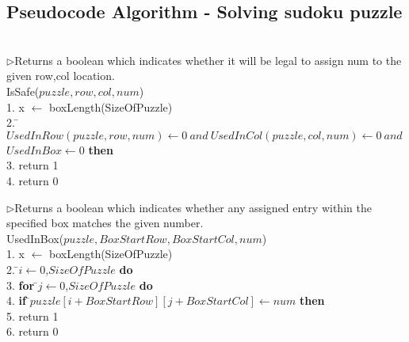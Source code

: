 \documentclass[12pt, letterpaper]{article}
\begin{document}
        \subsection{Pseudocode Algorithm - Solving sudoku puzzle}

            \begin{center}
            \begin{tabbing}
            \\
            $\rhd$Returns a boolean which indicates whether it will be legal to assign
               num to the\\ given row,col location. \\
            IsSafe($puzzle, row, col, num $) \\
            1. \indent x $\leftarrow$ boxLength(SizeOfPuzzle) \\
            2.  \=$UsedInRow(puzzle, row, num ) \leftarrow 0 \: and \: UsedInCol(puzzle,col,num) \leftarrow 0 \: and $ \\  \> $UsedInBox \leftarrow 0$ {\bf then} \\
            3. \indent            \> return 1 \\
            4. \indent return 0 \\ 
            \end{tabbing}
            \label{fig_alg_ex}
            \end{center}


            \begin{center}
            \begin{tabbing}
            $\rhd$Returns a boolean which indicates whether any assigned entry
                within the\\ specified box matches the given number.\\
            UsedInBox($puzzle, BoxStartRow, BoxStartCol, num $) \\
            1. \indent x $\leftarrow$ boxLength(SizeOfPuzzle) \\
            2.  \=$i \leftarrow 0$,$SizeOfPuzzle$ {\bf do} \\
            3. \indent            \> {\bf for} \=$j \leftarrow 0$,$SizeOfPuzzle$ {\bf do} \\
            4. \indent 	      \> 	\>  {\bf if} \=$puzzle[i + BoxStartRow][j + BoxStartCol] \leftarrow num$ {\bf then} \\
            5. \indent 	      \> 	\> 	\> return 1 \\
            6. \indent return 0 \\
            \end{tabbing}
            \label{fig_alg_ex}
            \end{center}
\end{document}
